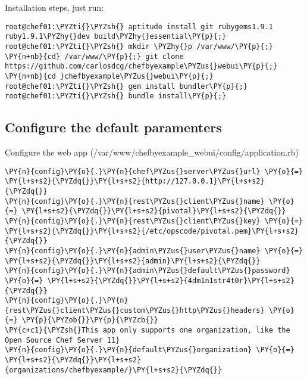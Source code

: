 Installation steps, just run:
\begin{codelisting}
\label{code:}
\codecaption{}
\begin{Verbatim}[fontsize=\relsize{-2.5},fontseries=b,commandchars=\\\{\}]
root@chef01:\PYZti{}\PYZsh{} aptitude install git rubygems1.9.1 ruby1.9.1\PYZhy{}dev build\PYZhy{}essential\PY{p}{;}
root@chef01:\PYZti{}\PYZsh{} mkdir \PYZhy{}p /var/www/\PY{p}{;} \PY{n+nb}{cd} /var/www/\PY{p}{;} git clone https://github.com/carlosdcg/chefbyexample\PYZus{}webui\PY{p}{;} \PY{n+nb}{cd }chefbyexample\PYZus{}webui\PY{p}{;}
root@chef01:\PYZti{}\PYZsh{} gem install bundler\PY{p}{;}
root@chef01:\PYZti{}\PYZsh{} bundle install\PY{p}{;}
\end{Verbatim}
\end{codelisting}

\subsection{Configure the default paramenters}

Configure the web app (/var/www/chefbyexample\_webui/config/application.rb)

\begin{codelisting}
\label{code:}
\codecaption{}
\begin{Verbatim}[fontsize=\relsize{-2.5},fontseries=b,commandchars=\\\{\}]
\PY{n}{config}\PY{o}{.}\PY{n}{chef\PYZus{}server\PYZus{}url} \PY{o}{=} \PY{l+s+s2}{\PYZdq{}}\PY{l+s+s2}{http://127.0.0.1}\PY{l+s+s2}{\PYZdq{}}
\PY{n}{config}\PY{o}{.}\PY{n}{rest\PYZus{}client\PYZus{}name} \PY{o}{=} \PY{l+s+s2}{\PYZdq{}}\PY{l+s+s2}{pivotal}\PY{l+s+s2}{\PYZdq{}}
\PY{n}{config}\PY{o}{.}\PY{n}{rest\PYZus{}client\PYZus{}key} \PY{o}{=} \PY{l+s+s2}{\PYZdq{}}\PY{l+s+s2}{/etc/opscode/pivotal.pem}\PY{l+s+s2}{\PYZdq{}}
\PY{n}{config}\PY{o}{.}\PY{n}{admin\PYZus{}user\PYZus{}name} \PY{o}{=}  \PY{l+s+s2}{\PYZdq{}}\PY{l+s+s2}{admin}\PY{l+s+s2}{\PYZdq{}}
\PY{n}{config}\PY{o}{.}\PY{n}{admin\PYZus{}default\PYZus{}password} \PY{o}{=} \PY{l+s+s2}{\PYZdq{}}\PY{l+s+s2}{4dm1n1str4t0r}\PY{l+s+s2}{\PYZdq{}}
\PY{n}{config}\PY{o}{.}\PY{n}{rest\PYZus{}client\PYZus{}custom\PYZus{}http\PYZus{}headers} \PY{o}{=} \PY{p}{\PYZob{}}\PY{p}{\PYZcb{}}
\PY{c+c1}{\PYZsh{}This app only supports one organization, like the Open Source Chef Server 11}
\PY{n}{config}\PY{o}{.}\PY{n}{default\PYZus{}organization} \PY{o}{=} \PY{l+s+s2}{\PYZdq{}}\PY{l+s+s2}{organizations/chefbyexample/}\PY{l+s+s2}{\PYZdq{}}
\end{Verbatim}
\end{codelisting}

